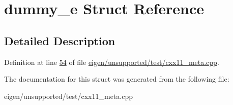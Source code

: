 \hypertarget{structdummy__e}{}\section{dummy\+\_\+e Struct Reference}
\label{structdummy__e}


\subsection{Detailed Description}


Definition at line \hyperlink{eigen_2unsupported_2test_2cxx11__meta_8cpp_source_l00054}{54} of file \hyperlink{eigen_2unsupported_2test_2cxx11__meta_8cpp_source}{eigen/unsupported/test/cxx11\+\_\+meta.\+cpp}.



The documentation for this struct was generated from the following file\+:\begin{DoxyCompactItemize}
\item 
eigen/unsupported/test/cxx11\+\_\+meta.\+cpp\end{DoxyCompactItemize}

